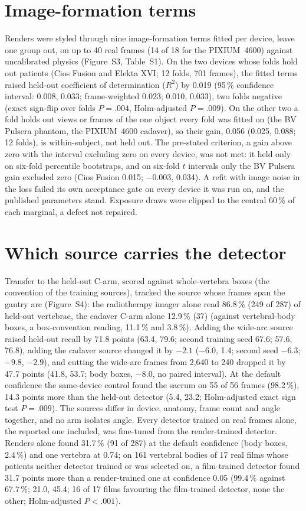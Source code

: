 \section*{Image-formation terms}
Renders were styled through nine image-formation terms fitted per device, leave one group out, on up to 40 real
frames (14 of 18 for the PIXIUM~4600) against uncalibrated physics (Figure~S3, Table~S1). On the two devices whose folds
hold out patients (Cios Fusion and Elekta XVI; 12 folds, 701 frames), the fitted terms raised held-out coefficient of
determination ($R^2$) by 0.019 (95\,\% confidence interval: 0.008, 0.033; frame-weighted 0.023; 0.010, 0.033), two
folds negative (exact sign-flip over folds $P=.004$, Holm-adjusted $P=.009$). On the other two a fold holds out views
or frames of the one object every fold was fitted on (the BV Pulsera phantom, the PIXIUM~4600 cadaver), so their
gain, 0.056 (0.025, 0.088; 12 folds), is within-subject, not held out. The pre-stated criterion, a gain above zero with the interval excluding zero on every device,
was not met: it held only on six-fold percentile bootstraps, and on six-fold $t$ intervals only the BV Pulsera
gain excluded zero (Cios Fusion 0.015; $-0.003$, 0.034). A refit with image noise in the loss failed its
own acceptance gate on every device it was run on, and the published parameters stand. Exposure draws were
clipped to the central 60\,\% of each marginal, a defect not repaired.

\section*{Which source carries the detector}
Transfer to the held-out C-arm, scored against whole-vertebra boxes (the convention of the training sources),
tracked the source whose frames span the gantry arc (Figure~S4): the radiotherapy imager alone read 86.8\,\% (249 of
287) of held-out vertebrae, the cadaver C-arm alone 12.9\,\% (37) (against vertebral-body boxes, a box-convention
reading, 11.1\,\% and 3.8\,\%). Adding the
wide-arc source raised held-out recall by 71.8 points (63.4, 79.6; second training seed 67.6; 57.6, 76.8), adding
the cadaver source changed it by $-2.1$ ($-6.0$, 1.4; second seed $-6.3$; $-9.8$, $-2.9$), and cutting the
wide-arc frames from 2,640 to 240 dropped it by 47.7 points (41.8, 53.7; body boxes, $-8.0$, no paired
interval). At the default confidence the
same-device control found the sacrum on 55 of 56 frames (98.2\,\%), 14.3 points more than the held-out detector
(5.4, 23.2; Holm-adjusted exact sign test $P=.009$). The sources differ in device, anatomy, frame count and angle
together, and no arm isolates angle. Every detector trained on real frames alone, the reported one included, was
fine-tuned from the render-trained detector. Renders alone found 31.7\,\% (91 of 287) at the default confidence
(body boxes, 2.4\,\%) and one vertebra at 0.74; on 161 vertebral bodies of 17 real films whose patients neither
detector trained or was selected on, a film-trained detector found 31.7 points more than a render-trained one at
confidence 0.05 (99.4\,\% against 67.7\,\%; 21.0, 45.4; 16 of 17 films favouring the film-trained detector, none the
other; Holm-adjusted $P<.001$).

